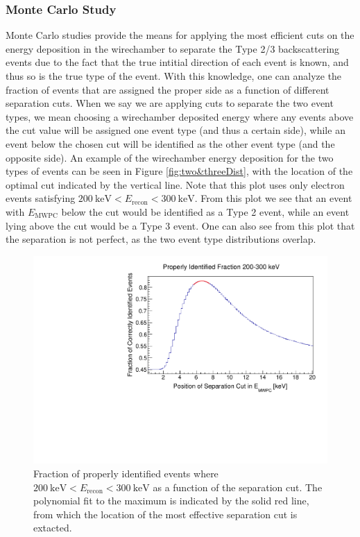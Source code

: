 \subsubsection{Monte Carlo Study}
Monte Carlo studies provide the
means for applying the most efficient cuts on the energy deposition in the wirechamber
to separate the Type 2/3 backscattering events due to the fact that the true intitial direction of each event
is known, and thus so is the true type of the event. With this knowledge, one can analyze the fraction of events
that are assigned the proper side as a function of different separation cuts. When we say we are applying cuts to
separate the two event types, we mean choosing a wirechamber deposited energy where
any events above the cut value will be assigned one event type (and thus a certain side), while an event below
the chosen cut will be identified as the other event type (and the opposite side). An example of the
wirechamber energy deposition for the two types of events can be seen in
Figure \ref{fig:two&threeDist}, with the location of the optimal cut indicated by the
vertical line. Note that this plot uses only electron events satisfying
$200\mathrm{~keV}<E_{\mathrm{recon}}<300\mathrm{~keV}$.
From this plot we see that an event with $E_{\mathrm{MWPC}}$
below the cut would be identified as a Type 2 event, while an event lying above the cut
would be a Type 3 event. One can also see from this plot that the separation is not perfect,
as the two event type distributions overlap.

\begin{figure}[h]
  \centering
  \includegraphics[scale=0.55,page=1]{4-UCNACalibrations/properly_identified_2011_200-300keV.pdf}
  \caption{Fraction of properly identified events where
    $200\mathrm{~keV}<E_{\mathrm{recon}}<300\mathrm{~keV}$ as a function of the separation cut.
    The polynomial fit to the maximum is indicated by the solid red line, from which the location
    of the most effective separation cut is extacted.}
  \label{fig:propID}
\end{figure}

